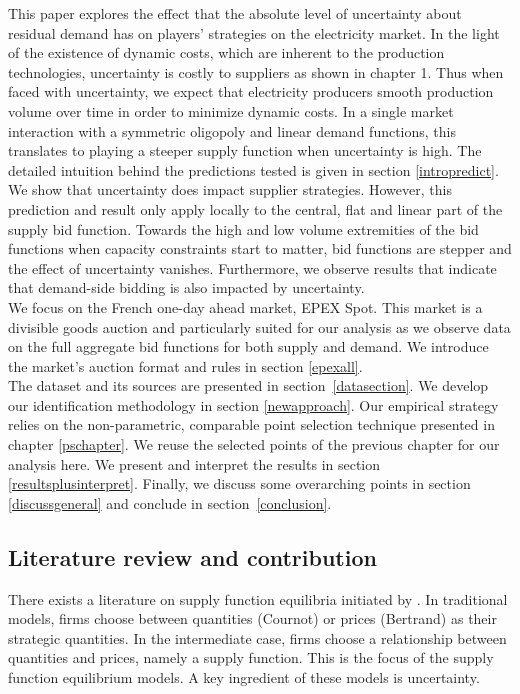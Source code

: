 This paper explores the effect that the absolute level of uncertainty about residual demand has on players' strategies on the electricity market. In the light of the existence of dynamic costs, which are inherent to the production technologies, uncertainty is costly to suppliers as shown in chapter 1. Thus when faced with uncertainty, we expect that electricity producers smooth production volume over time in order to minimize dynamic costs. In a single market interaction with a symmetric oligopoly and linear demand functions, this translates to playing a steeper supply function when uncertainty is high. The detailed intuition behind the predictions tested is given in section \ref{intropredict}. \\

\label{introresults}
We show that uncertainty does impact supplier strategies. However, this prediction and result only apply locally to the central, flat and linear part of the supply bid function. Towards the high and low volume extremities of the bid functions when capacity constraints start to matter, bid functions are stepper and the effect of uncertainty vanishes. Furthermore, we observe results that indicate that demand-side bidding is also impacted by uncertainty.  \\

We focus on the French one-day ahead market, EPEX Spot. This market is a divisible goods auction and particularly suited for our analysis as we observe data on the full aggregate bid functions for both supply and demand. We introduce the market's auction format and rules in section \ref{epexall}.\\

The dataset and its sources are presented in section~\ref{datasection}.
We develop our identification methodology in section \ref{newapproach}. Our empirical strategy relies on the non-parametric, comparable point selection technique presented in chapter \ref{pschapter}. 
We reuse the selected points of the previous chapter for our analysis here. 
We present and interpret the results in section \ref{resultsplusinterpret}. Finally, we discuss some overarching points in section \ref{discussgeneral} and conclude in section~\ref{conclusion}.


\subsection{Literature review and contribution}
\label{litrev}

There exists a literature on supply function equilibria initiated by \cite{KM}. 
In traditional models, firms choose between quantities (Cournot) or prices (Bertrand) as their strategic quantities. In the intermediate case, firms choose a relationship between quantities and prices, namely a supply function. This is the focus of the supply function equilibrium models. A key ingredient of these models is uncertainty.\\


